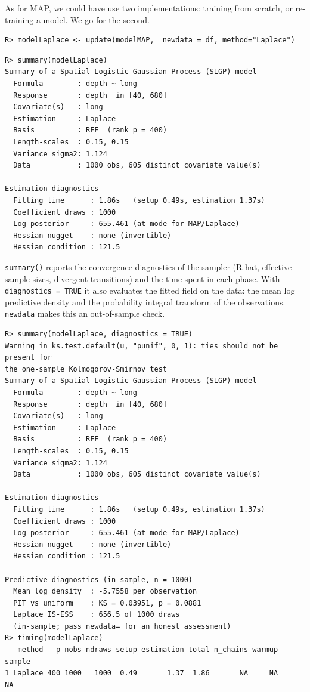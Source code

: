 \documentclass[
]{article}
\newcounter{none} %
\begin{document}
As for MAP, we could have use two implementations: training from scratch, or re-training a model. We go for the second.

\begin{verbatim}
R> modelLaplace <- update(modelMAP,  newdata = df, method="Laplace")
\end{verbatim}

\begin{verbatim}
R> summary(modelLaplace)
Summary of a Spatial Logistic Gaussian Process (SLGP) model
  Formula        : depth ~ long
  Response       : depth  in [40, 680]
  Covariate(s)   : long
  Estimation     : Laplace
  Basis          : RFF  (rank p = 400)
  Length-scales  : 0.15, 0.15
  Variance sigma2: 1.124
  Data           : 1000 obs, 605 distinct covariate value(s)

Estimation diagnostics
  Fitting time      : 1.86s   (setup 0.49s, estimation 1.37s)
  Coefficient draws : 1000
  Log-posterior     : 655.461 (at mode for MAP/Laplace)
  Hessian nugget    : none (invertible)
  Hessian condition : 121.5
\end{verbatim}

\texttt{summary()} reports the convergence diagnostics of the sampler (R-hat, effective sample sizes, divergent transitions) and the time spent in each phase. With \texttt{diagnostics\ =\ TRUE} it also evaluates the fitted field on the data: the mean log predictive density and the probability integral transform of the observations. \texttt{newdata} makes this an out-of-sample check.

\begin{verbatim}
R> summary(modelLaplace, diagnostics = TRUE)
Warning in ks.test.default(u, "punif", 0, 1): ties should not be present for
the one-sample Kolmogorov-Smirnov test
Summary of a Spatial Logistic Gaussian Process (SLGP) model
  Formula        : depth ~ long
  Response       : depth  in [40, 680]
  Covariate(s)   : long
  Estimation     : Laplace
  Basis          : RFF  (rank p = 400)
  Length-scales  : 0.15, 0.15
  Variance sigma2: 1.124
  Data           : 1000 obs, 605 distinct covariate value(s)

Estimation diagnostics
  Fitting time      : 1.86s   (setup 0.49s, estimation 1.37s)
  Coefficient draws : 1000
  Log-posterior     : 655.461 (at mode for MAP/Laplace)
  Hessian nugget    : none (invertible)
  Hessian condition : 121.5

Predictive diagnostics (in-sample, n = 1000)
  Mean log density  : -5.7558 per observation
  PIT vs uniform    : KS = 0.03951, p = 0.0881
  Laplace IS-ESS    : 656.5 of 1000 draws
  (in-sample; pass newdata= for an honest assessment)
R> timing(modelLaplace)
   method   p nobs ndraws setup estimation total n_chains warmup sample
1 Laplace 400 1000   1000  0.49       1.37  1.86       NA     NA     NA
\end{verbatim}
\end{document}

